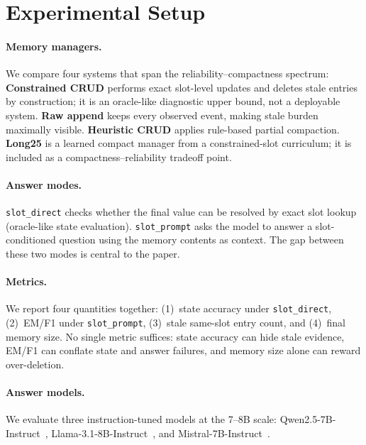 \documentclass[11pt,twocolumn]{article}
\begin{document}
\section{Experimental Setup}

\paragraph{Memory managers.}
We compare four systems that span the reliability--compactness spectrum:
\textbf{Constrained CRUD} performs exact slot-level updates and deletes stale entries by construction; it is an oracle-like diagnostic upper bound, not a deployable system.
\textbf{Raw append} keeps every observed event, making stale burden maximally visible.
\textbf{Heuristic CRUD} applies rule-based partial compaction.
\textbf{Long25} is a learned compact manager from a constrained-slot curriculum; it is included as a compactness--reliability tradeoff point.

\paragraph{Answer modes.}
\texttt{slot\_direct} checks whether the final value can be resolved by exact slot lookup (oracle-like state evaluation).
\texttt{slot\_prompt} asks the model to answer a slot-conditioned question using the memory contents as context.
The gap between these two modes is central to the paper.

\paragraph{Metrics.}
We report four quantities together:
(1)~state accuracy under \texttt{slot\_direct},
(2)~EM/F1 under \texttt{slot\_prompt},
(3)~stale same-slot entry count, and
(4)~final memory size.
No single metric suffices: state accuracy can hide stale evidence, EM/F1 can conflate state and answer failures, and memory size alone can reward over-deletion.

\paragraph{Answer models.}
We evaluate three instruction-tuned models at the 7--8B scale: Qwen2.5-7B-Instruct~\citep{qwen25}, Llama-3.1-8B-Instruct~\citep{llama31}, and Mistral-7B-Instruct~\citep{mistral}.
\end{document}
